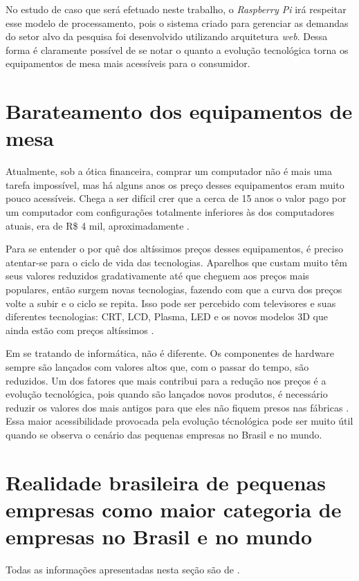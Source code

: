 No estudo de caso que será efetuado neste trabalho, o \textit{Raspberry Pi} irá respeitar esse modelo de processamento, pois o sistema criado para gerenciar as demandas do setor alvo da pesquisa foi desenvolvido utilizando arquitetura \textit{web}. Dessa forma é claramente possível de se notar o quanto a evolução tecnológica torna os equipamentos de mesa mais acessíveis para o consumidor.

\section{Barateamento dos equipamentos de mesa}

Atualmente, sob a ótica financeira, comprar um computador não é mais uma tarefa impossível, mas há alguns anos os preço desses equipamentos eram muito pouco acessíveis. Chega a ser difícil crer que a cerca de 15 anos o valor pago por um computador com configurações totalmente inferiores às dos computadores atuais, era de R\$ 4 mil, aproximadamente \cite{HAMANN}.

Para se entender o por quê dos altíssimos preços desses equipamentos, é preciso atentar-se para o ciclo de vida das tecnologias. Aparelhos que custam muito têm seus valores reduzidos gradativamente até que cheguem aos preços mais populares, então surgem novas tecnologias, fazendo com que a curva dos preços volte a subir e o ciclo se repita. Isso pode ser percebido com televisores e suas diferentes tecnologias: CRT, LCD, Plasma, LED e os novos modelos 3D que ainda estão com preços altíssimos \cite{HAMANN}.

Em se tratando de informática, não é diferente. Os componentes de hardware sempre são lançados com valores altos que, com o passar do tempo, são reduzidos. Um dos fatores que mais contribui para a redução nos preços é a evolução tecnológica, pois quando são lançados novos produtos, é necessário reduzir os valores dos mais antigos para que eles não fiquem presos nas fábricas \cite{HAMANN}. Essa maior acessibilidade provocada pela evolução técnológica pode ser muito útil quando se observa o cenário das pequenas empresas no Brasil e no mundo.

\section{Realidade brasileira de pequenas empresas como maior categoria de empresas no Brasil e no mundo}

Todas as informações apresentadas nesta seção são de .

